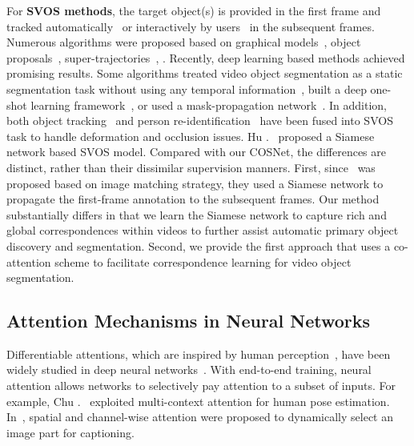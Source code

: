 \documentclass[10pt,twocolumn,letterpaper]{article}
\begin{document}
For \textbf{SVOS methods}, the target object(s) is provided in the first frame and tracked automatically~\cite{DBLP:conf/cvpr/WangSP15,cheng2018fast,DBLP:conf/cvpr/CaellesMPLCG17,yang2018efficient,Bao_2018_CVPR,DBLP:conf/iccv/YoonRKLSK17,xiao2018monet,zuo2018learning} or interactively by users~\cite{Bai2009} in the subsequent frames. Numerous algorithms were proposed based on graphical models~\cite{DBLP:conf/cvpr/Tsai0B16}, object proposals~\cite{DBLP:conf/iccv/PerazziWGS15}, super-trajectories~\cite{wang2017}, \etc.  Recently, deep learning based methods achieved promising results. Some algorithms treated video object segmentation as a static segmentation task without using any temporal information~\cite{DBLP:conf/cvpr/PerazziKBSS17}, built a deep one-shot learning framework~\cite{DBLP:conf/cvpr/CaellesMPLCG17,wang2015robust}, or used a mask-propagation network~\cite{DBLP:conf/cvpr/JampaniGG17}. In addition, both object tracking~\cite{DAVIS2017-2nd,cheng2018fast,Ci_2018_ECCV,Lu_2018_ECCV} and person re-identification~\cite{Li_2018_ECCV,DBLP:conf/eccv/YanNSMYY16} have been fused into SVOS task to handle  deformation and occlusion issues. Hu \etal.~\cite{Hu_2018_ECCV} proposed a Siamese network based SVOS model. Compared with our COSNet, the differences are distinct, rather than their dissimilar supervision manners. First, since~\cite{Hu_2018_ECCV} was proposed based on image matching strategy, they used a Siamese network to propagate the first-frame annotation to the subsequent frames. Our method substantially differs in that we learn the Siamese network to capture rich and global correspondences within videos to further assist automatic primary object discovery and segmentation. Second, we provide the first approach that uses a co-attention scheme to facilitate correspondence learning for video object segmentation.

\subsection{Attention Mechanisms in Neural Networks}\label{sec:amnn}
Differentiable attentions, which are inspired by human perception~\cite{DBLP:journals/neco/DenilBLF12,wang2018deep}, have been widely studied in deep neural networks~\cite{jetley2018learn,DBLP:conf/nips/VaswaniSPUJGKP17,mnih2014recurrent,DBLP:conf/nips/JaderbergSZK15,DBLP:conf/cvpr/WangJQYLZWT17, NonLocal2018,Fang_2018_ECCV}. With end-to-end training, neural attention allows networks to selectively pay attention to a subset of inputs. For example,
Chu \etal.~\cite{DBLP:conf/cvpr/ChuYOMYW17} exploited multi-context attention for human pose estimation. In~\cite{DBLP:conf/cvpr/ChenZXNSLC17}, spatial and channel-wise attention were proposed to dynamically select an  image part for captioning.
\end{document}

